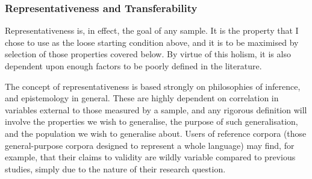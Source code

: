 







\subsubsection{Representativeness and Transferability}
Representativeness is, in effect, the goal of any sample.  It is the property that I chose to use as the loose starting condition above, and it is to be maximised by selection of those properties covered below.  By virtue of this holism, it is also dependent upon enough factors to be poorly defined in the literature.

The concept of representativeness is based strongly on philosophies of inference, and epistemology in general.  These are highly dependent on correlation in variables external to those measured by a sample, and any rigorous definition will involve the properties we wish to generalise, the purpose of such generalisation, and the population we wish to generalise about.  Users of reference corpora (those general-purpose corpora designed to represent a whole language) may find, for example, that their claims to validity are wildly variable compared to previous studies, simply due to the nature of their research question.



